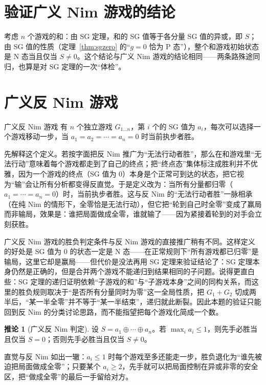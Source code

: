 \documentclass[UTF8,a4paper,11pt,oneside,openany,fontset=fandol]{ctexbook}
\theoremstyle{definition}
\newtheorem{corollary}[definition]{推论}
\begin{document}
\section{验证广义 Nim 游戏的结论}
考虑 $n$ 个游戏的和：由 SG 定理，和的 SG 值等于各分量 SG 值的异或，即 $S$；由 SG 值的性质（定理~\ref{thm:sgzero} 的“$g=0$ 恰为 P 态”），整个和游戏初始状态是 N 态当且仅当 $S\ne0$。这个结论与广义 Nim 游戏的结论相同——两条路殊途同归，也算是对 SG 定理的一次“体检”。

\section{广义反 Nim 游戏}
\begin{problem}{广义反 Nim 游戏}
有 $n$ 个独立游戏 $G_{1\ldots n}$，第 $i$ 个的 SG 值为 $a_i$，每次可以选择一个游戏移动一步，当 $a_1=a_2=\cdots=a_n=0$ 时当前执步者胜。
\end{problem}

先解释这个定义。若按字面把反 Nim 推广为“无法行动者胜”，那么在和游戏里“无法行动”意味着每个游戏都走到了自己的终点；把“终点态”集体标注成胜利并不优雅，因为一个游戏的终点（SG 值为 $0$）本身是个正常可到达的状态，把它视为“输”会让所有分析都变得反直觉。于是定义改为：当所有分量都归零（$a_1=\cdots=a_n=0$）时，当前执步者胜。这与反 Nim 的“无法行动者胜”一脉相承（在纯 Nim 的情形下，全零恰是无法行动），但它把“轮到自己时全零”变成了赢局而非输局，效果是：谁把局面做成全零，谁就输了——因为紧接着轮到的对手会立刻获胜。

广义反 Nim 游戏的胜负判定条件与反 Nim 游戏的直接推广稍有不同。这样定义的好处是 SG 值为 $0$ 的状态一定是 N 态——在正常规则下“所有游戏都已归零”是输局，这里它却是赢局——但代价是没法再用 SG 定理来验证结论了：SG 定理本身仍然是正确的，但是合并两个游戏不能递归到结果相同的子问题。说得更直白些：SG 定理的递归证明依赖“子游戏的和”与“子游戏本身”之间的同构关系，而这里的胜负规则取决于“是否所有分量同时为零”这一全局性质，把 $G_1+G_2$ 切成两半后，“某一半全零”并不等于“某一半结束”，递归就此断裂。因此本题的验证只能回到反 Nim 的分类讨论思路，而不能指望把每个游戏化简成一个数。

\begin{corollary}[广义反 Nim 判定]
设 $S=a_1\oplus\cdots\oplus a_n$。若 $\max_i a_i\le1$，则先手必胜当且仅当 $S=0$；否则先手必胜当且仅当 $S\ne0$。
\end{corollary}

直觉与反 Nim 如出一辙：$a_i\le1$ 时每个游戏至多还能走一步，胜负退化为“谁先被迫把局面做成全零”；只要某个 $a_i\ge2$，先手就可以把局面控制在异或非零的安全区，把“做成全零”的最后一手留给对方。
\end{document}
